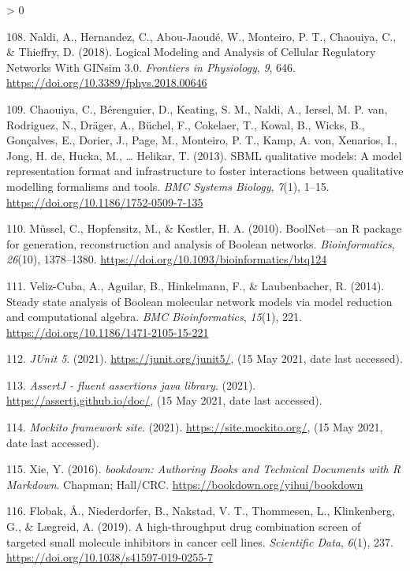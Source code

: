 \documentclass[
  12pt,
]{book}
\newlength{\cslhangindent}
\newenvironment{CSLReferences}[2] %
 {%
  \setlength{\parindent}{0pt}
  \ifodd #1 \everypar{\setlength{\hangindent}{\cslhangindent}}\ignorespaces\fi
  \ifnum #2 > 0
  \setlength{\parskip}{#2\baselineskip}
  \fi
 }%
 {}
\begin{document}
\begin{CSLReferences}{1}{0}
\leavevmode\hypertarget{ref-Naldi2018b}{}%
108. Naldi, A., Hernandez, C., Abou-Jaoudé, W., Monteiro, P. T., Chaouiya, C., \& Thieffry, D. (2018). {Logical Modeling and Analysis of Cellular Regulatory Networks With GINsim 3.0}. \emph{Frontiers in Physiology}, \emph{9}, 646. \url{https://doi.org/10.3389/fphys.2018.00646}

\leavevmode\hypertarget{ref-Chaouiya2013}{}%
109. Chaouiya, C., Bérenguier, D., Keating, S. M., Naldi, A., Iersel, M. P. van, Rodriguez, N., Dräger, A., Büchel, F., Cokelaer, T., Kowal, B., Wicks, B., Gonçalves, E., Dorier, J., Page, M., Monteiro, P. T., Kamp, A. von, Xenarios, I., Jong, H. de, Hucka, M., \ldots{} Helikar, T. (2013). {SBML qualitative models: A model representation format and infrastructure to foster interactions between qualitative modelling formalisms and tools}. \emph{BMC Systems Biology}, \emph{7}(1), 1--15. \url{https://doi.org/10.1186/1752-0509-7-135}

\leavevmode\hypertarget{ref-Mussel2010}{}%
110. Müssel, C., Hopfensitz, M., \& Kestler, H. A. (2010). {BoolNet---an R package for generation, reconstruction and analysis of Boolean networks}. \emph{Bioinformatics}, \emph{26}(10), 1378--1380. \url{https://doi.org/10.1093/bioinformatics/btq124}

\leavevmode\hypertarget{ref-Veliz-Cuba2014}{}%
111. Veliz-Cuba, A., Aguilar, B., Hinkelmann, F., \& Laubenbacher, R. (2014). {Steady state analysis of Boolean molecular network models via model reduction and computational algebra}. \emph{BMC Bioinformatics}, \emph{15}(1), 221. \url{https://doi.org/10.1186/1471-2105-15-221}

\leavevmode\hypertarget{ref-JUnit5}{}%
112. \emph{{JUnit 5}}. (2021). \url{https://junit.org/junit5/}, (15 May 2021, date last accessed).

\leavevmode\hypertarget{ref-AssertJ}{}%
113. \emph{{AssertJ - fluent assertions java library}}. (2021). \url{https://assertj.github.io/doc/}, (15 May 2021, date last accessed).

\leavevmode\hypertarget{ref-Mockito-site}{}%
114. \emph{{Mockito framework site}}. (2021). \url{https://site.mockito.org/}, (15 May 2021, date last accessed).

\leavevmode\hypertarget{ref-Xie2016}{}%
115. Xie, Y. (2016). \emph{{bookdown: Authoring Books and Technical Documents with R Markdown}}. Chapman; Hall/CRC. \url{https://bookdown.org/yihui/bookdown}

\leavevmode\hypertarget{ref-Flobak2019}{}%
116. Flobak, Å., Niederdorfer, B., Nakstad, V. T., Thommesen, L., Klinkenberg, G., \& Lægreid, A. (2019). {A high-throughput drug combination screen of targeted small molecule inhibitors in cancer cell lines}. \emph{Scientific Data}, \emph{6}(1), 237. \url{https://doi.org/10.1038/s41597-019-0255-7}


\end{CSLReferences}
\end{document}
